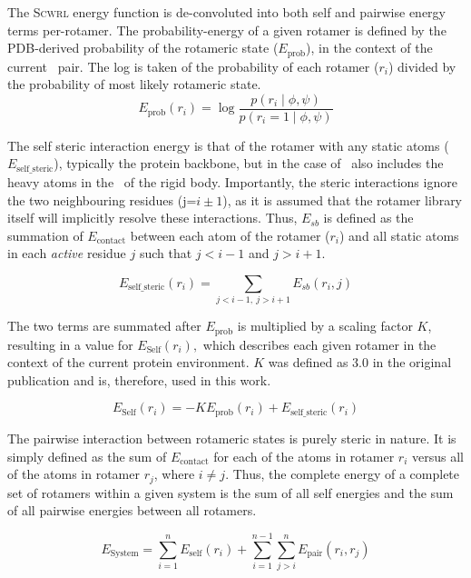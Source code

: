 The \textsc{Scwrl} energy function is de-convoluted into both self and pairwise energy terms per-rotamer.
The probability-energy of a given rotamer is defined by the PDB-derived probability of the rotameric state ($E_\text{prob}$), in the context of the current \phipsi\ pair. The log is taken of the probability of each rotamer ($r_i$) divided by the probability of
most likely rotameric state.\begin{equation}
E_\text{prob}(r_i) = \log\frac{p(r_{i}\mid\phi,\psi)}{p(r_{i}=1\mid\phi,\psi)}
\end{equation}

The self steric interaction energy is that of the rotamer with any static atoms ($E_\text{self\_steric}$), typically the protein backbone, but in the case of \arcus\ also includes the heavy atoms in the \sidechains\ of the rigid body.
Importantly, the steric interactions ignore the two neighbouring residues (j=$i\pm1$), as it is assumed that the rotamer library itself will implicitly resolve these interactions.
Thus, $E_{sb}$ is defined as the summation of  $E_\text{contact}$  between each atom of the rotamer
($r_i$) and all static atoms in each \emph{active} residue $j$ such that $j<i-1$ and $j>i+1$.

\begin{equation}
E_\text{self\_steric}(r_i) = \sum_{j<i-1,\ j>i+1} E_{sb}(r_i,j)
\end{equation}

The two terms are summated after $E_\text{prob}$ is multiplied by a scaling factor $K$, resulting in a value for $E_\text{Self}(r_i),$ which describes each given rotamer in the context of the current protein environment.
$K$ was defined as 3.0 in the original publication and is, therefore, used in this work.

\begin{equation}
E_\text{Self}(r_i) = -KE_\text{prob}(r_i) + E_\text{self\_steric}(r_i) 
\end{equation}

The pairwise interaction between rotameric states is purely steric in nature. It is simply defined as the sum of $E_\text{contact}$ for each of the \emph{\sidechain} atoms in rotamer $r_i$ versus all of the \emph{\sidechain} atoms in rotamer $r_j$, where $i \ne j$. Thus, the complete energy of a complete set of rotamers within a given system is the sum of all self energies and the sum of all pairwise energies between all rotamers.

\begin{equation}
E_\text{System} = \sum_{i=1}^{n} E_\text{self}(r_i) +  \sum_{i=1}^{n-1}  \sum_{j>i}^{n} E_\text{pair}(r_i,r_{j}) 
\end{equation}

